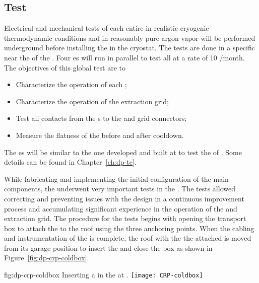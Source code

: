 \subsection{\Coldbox Test}
 \label{sec:dp-crp-coldboxtest}
Electrical and mechanical tests of each entire  in realistic cryogenic thermodynamic conditions and in reasonably pure argon vapor will be performed underground  before installing the  in the cryostat. The tests are done in a  specific \coldbox near the  of the . Four \coldbox{}es will run in parallel to test  all  at a rate of \num{10} /month.
The objectives of this global  test are to
\begin{itemize}
\item Characterize the  operation of each ;
\item Characterize the  operation of the extraction grid;
\item Test all  contacts from the \fdth{}s to the  and grid connectors;
\item Measure the flatness of the  before and after cooldown.
\end{itemize}
The \coldbox{}es will be similar to the one developed and built at   to test the  of . Some details can be found in Chapter~\ref{ch:dp-tc}. 

While fabricating and  implementing the initial configuration of the main components, the   underwent very important tests in
the \coldbox. The \coldbox tests allowed correcting and preventing issues with the  design in a continuous improvement process and accumulating significant  experience in the  operation of the  and extraction grid.
The procedure for the tests begins with opening the transport box to attach the  to the \coldbox roof using the three anchoring points.
 When the cabling and instrumentation of the  is complete,  the \coldbox roof with the the  attached is moved from its garage position to insert the  and close the box as shown in Figure~\ref{fig:dp-crp-coldbox}. 
 
 \begin{dunefigure}
{fig:dp-crp-coldbox}
{Inserting a   in the \coldbox at .}
\texttt{[image: CRP-coldbox]}
\end{dunefigure}

